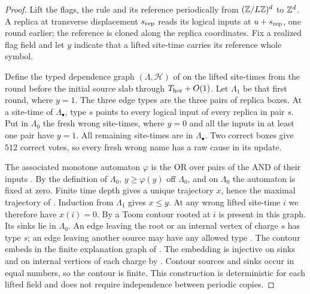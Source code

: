 \begin{proof}
Lift the flags, the rule and its reference periodically from
\((\mathbb Z/L\mathbb Z)^d\) to \(\mathbb Z^d\). A replica at transverse displacement
\(s_{\rm rep}\) reads its logical inputs at \(u+s_{\rm rep}\), one round earlier;
the reference is cloned along the replica coordinates. Fix a realized
flag field and let \(y\) indicate that a lifted site-time carries its
reference whole symbol.

Define the typed dependence graph \((\Lambda,\mathcal H)\) of
\cite[Definition~20]{SST2026} on the lifted site-times from the round
before the initial source slab through \(T_{\rm hor}+O(1)\). Let \(\Lambda_1\)
be that first round, where \(y=1\). The three edge types are the three
pairs of replica boxes. At a site-time of \(\Lambda_\bullet\), type
\(s\) points to every logical input of every replica in pair \(s\).
Put in \(\Lambda_0\) the fresh wrong site-times, where \(y=0\) and
all the inputs in at least one pair have \(y=1\). All remaining
site-times are in \(\Lambda_\bullet\). Two correct boxes give \(512\)
correct votes, so every fresh wrong name has a raw cause in its update.

The associated monotone automaton \(\varphi\) is the OR over pairs of
the AND of their inputs \mbox{\cite[(2.14)]{SST2026}}. By the definition of \(\Lambda_0\),
\(y\ge\varphi(y)\) off \(\Lambda_0\), and on \(\Lambda_0\) the
automaton is fixed at zero. Finite time depth gives a unique trajectory
\(x\), hence the maximal trajectory of \cite[Lemma~13]{SST2026}. Induction from \(\Lambda_1\) gives \(x\le y\). At any wrong
lifted site-time \(i\) we therefore have \(x(i)=0\).
By \cite[Theorem~22]{SST2026} a Toom contour rooted at \(i\) is
present in this graph. Its sinks lie in \(\Lambda_0\). An edge
leaving the root or an internal vertex of charge \(s\) has type \(s\);
an edge leaving another source may have any allowed type
\cite[Definition~21]{SST2026}. The contour embeds in the finite explanation graph of \cite[Proposition~31 and Theorem~33]{SST2026}. The embedding is injective on sinks and on internal vertices of each charge by \cite[Definition~17]{SST2026}. Contour sources and sinks occur in equal numbers, so the contour is finite.
This construction is deterministic for each lifted field and does not
require independence between periodic copies.


\end{proof}
